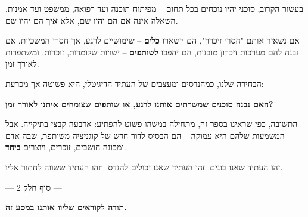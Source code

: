 
בעשור הקרוב, סוכני  יהיו נוכחים בכל תחום – מפיתוח תוכנה ועד רפואה, ממשפט ועד אמנות. השאלה אינה \textbf{אם} הם יהיו שם, אלא \textbf{איך} הם יהיו שם.

אם נשאיר אותם "חסרי זיכרון", הם יישארו \textbf{כלים} – שימושיים לרגע, אך חסרי המשכיות. אם נבנה להם מערכות זיכרון מובנות, הם יהפכו \textbf{לשותפים} – ישויות שלומדות, זוכרות, ומשתפרות לאורך זמן.

הבחירה שלנו, כמהנדסים ומעצבים של העתיד הדיגיטלי, היא פשוטה אך מכרעת:

\textbf{האם נבנה סוכנים שמשרתים אותנו לרגע, או שותפים שצומחים איתנו לאורך זמן?}

התשובה, כפי שראינו בספר זה, מתחילה במשהו פשוט להפתיע: ארבעה קבצי  בתיקייה. אבל המשמעות שלהם היא עמוקה – הם הבסיס לדור חדש של קוגניציה משותפת, שבה אדם ומכונה חושבים, זוכרים, ויוצרים \textbf{ביחד}.

זהו העתיד שאנו בונים. זהו העתיד שאנו יכולים להנדס. וזהו העתיד ששווה לחתור אליו.

\vspace{1em}

\begin{center}
--- סוף חלק \num{2} ---

\vspace{0.5em}

\textbf{תודה לקוראים שליוו אותנו במסע זה.}
\end{center}

\begin{center}
\end{center}
